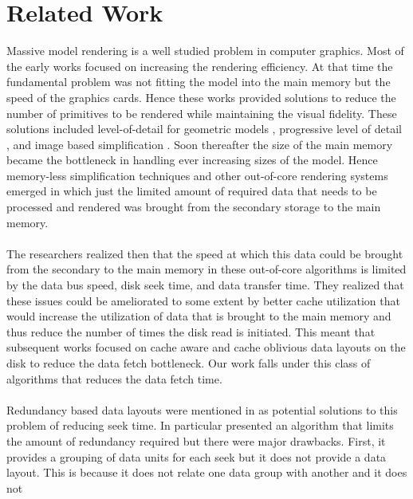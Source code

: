 
\section{Related Work}

Massive model rendering is a well studied problem in computer graphics. Most of the early works focused on increasing the rendering efficiency. At that time the fundamental problem was not fitting the model into the main memory but the speed of the graphics cards. Hence these works provided solutions to reduce the number of primitives to be rendered while maintaining the visual fidelity. These solutions included level-of-detail for geometric models \cite{Luebke02}, progressive level of detail \cite{Hoppe:98b,Hoppe:97,Hoppe:96,SG:01}, and image based simplification \cite{ACWBZEHHSBWBM:99}. Soon thereafter the size of the main memory became the bottleneck in handling ever increasing sizes of the model. Hence memory-less simplification techniques \cite{LT:99}  and other out-of-core rendering systems \cite{Silva02,VM:02} emerged in which just the limited amount of required data that needs to be processed and rendered was brought from the secondary storage to the main memory. \\
\\
The researchers realized then that the speed at which this data
could be brought from the secondary to the main memory in these out-of-core
algorithms is limited by the data bus speed, disk seek time, and data transfer
time. They realized that these issues could be ameliorated to some extent by
better cache utilization that would increase the utilization of data that is
brought to the main memory and thus reduce the number of times the disk read is
initiated. This meant that subsequent works focused on cache aware
\cite{ssdpaper} and cache oblivious data layouts
\cite{cacheobliviouslayout,YOON:2006:MeshLayout} on the disk to reduce the
data fetch bottleneck. Our work falls under this class of algorithms that
reduces the data fetch time. \\
\\
Redundancy based data layouts were mentioned in
\cite{Patterson88,singleseeklayout,optimizingredundancy} as potential solutions
to this problem of reducing seek time. In particular
\cite{optimizingredundancy} presented an algorithm that limits the amount of
redundancy required but there were major drawbacks. First, it provides a
grouping of data units for each seek but it does not provide a data layout.
This is because it does not relate one data group with another and it does not
